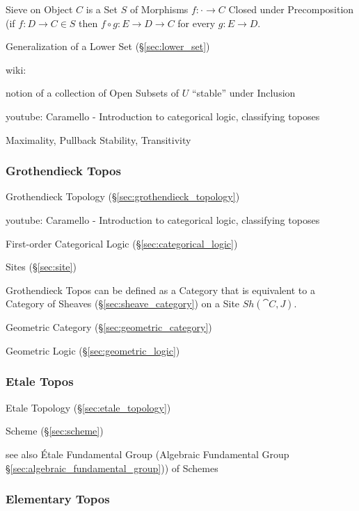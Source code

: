 Sieve on Object $C$ is a Set $S$ of Morphisms $f : \cdot \rightarrow
C$ Closed under Precomposition (if $f : D \rightarrow C \in S$ then $f
\circ g : E \rightarrow D \rightarrow C$ for every $g : E \rightarrow
D$.

Generalization of a Lower Set (\S\ref{sec:lower_set})

wiki:

notion of a collection of Open Subsets of $U$ ``stable'' under
Inclusion %

youtube: Caramello - Introduction to categorical logic, classifying
toposes

Maximality, Pullback Stability, Transitivity %



\subsubsection{Grothendieck Topos}\label{sec:grothendieck_topos}

Grothendieck Topology (\S\ref{sec:grothendieck_topology})

youtube: Caramello - Introduction to categorical logic, classifying
toposes

First-order Categorical Logic (\S\ref{sec:categorical_logic})

Sites (\S\ref{sec:site})

Grothendieck Topos can be defined as a Category that is equivalent to
a Category of Sheaves (\S\ref{sec:sheave_category}) on a Site
$Sh(\cat{C},J)$.

Geometric Category (\S\ref{sec:geometric_category})

Geometric Logic (\S\ref{sec:geometric_logic})



\subsubsection{Etale Topos}\label{sec:etale_topos}

Etale Topology (\S\ref{sec:etale_topology})

Scheme (\S\ref{sec:scheme})

see also \'Etale Fundamental Group (Algebraic Fundamental Group
\S\ref{sec:algebraic_fundamental_group})) of Schemes



\subsubsection{Elementary Topos}\label{sec:elementary_topos}

